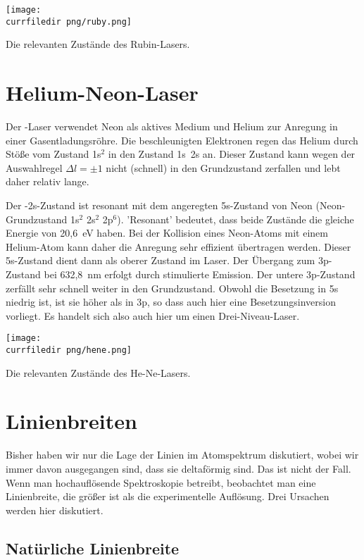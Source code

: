 \begin{marginfigure}
    \texttt{[image: \\currfiledir png/ruby.png]}
    \caption{Die relevanten Zustände des Rubin-Lasers.}
    \label{fig:7_ruby_laser}
\end{marginfigure}

\section{Helium-Neon-Laser}

Der -Laser verwendet Neon als aktives Medium und Helium zur Anregung in einer Gasentladungsröhre. Die beschleunigten Elektronen regen das Helium durch Stöße vom Zustand 1s$^2$ in den Zustand 1s~2s an. Dieser Zustand kann wegen der Auswahlregel $\Delta l = \pm1$ nicht (schnell) in den Grundzustand zerfallen und lebt daher relativ lange. 

Der -2s-Zustand ist resonant mit dem angeregten 5s-Zustand von Neon (Neon-Grundzustand 1s$^2$ 2s$^2$ 2p$^6$). 'Resonant' bedeutet, dass beide Zustände die gleiche Energie von 20,6~eV haben.  Bei der Kollision eines Neon-Atoms mit einem Helium-Atom kann daher die Anregung sehr effizient übertragen werden. Dieser 5s-Zustand dient dann als oberer Zustand im Laser. Der Übergang zum 3p-Zustand bei 632,8~nm erfolgt durch stimulierte Emission. Der untere 3p-Zustand zerfällt sehr schnell weiter in den Grundzustand. Obwohl die Besetzung in 5s niedrig ist, ist sie höher als in 3p, so dass auch hier eine Besetzungsinversion vorliegt. Es handelt sich also auch hier um einen Drei-Niveau-Laser.

\begin{marginfigure}
    \texttt{[image: \\currfiledir png/hene.png]}
    \caption{Die relevanten Zustände des He-Ne-Lasers.}
    \label{fig:7_hene_laser}
\end{marginfigure}

\section{Linienbreiten}

Bisher haben wir nur die Lage der Linien im Atomspektrum diskutiert, wobei wir immer davon ausgegangen sind, dass sie deltaförmig sind. Das ist nicht der Fall. Wenn man hochauflösende Spektroskopie betreibt, beobachtet man eine Linienbreite, die größer ist als die experimentelle Auflösung. Drei Ursachen werden hier diskutiert.

\subsection{Natürliche Linienbreite} 

